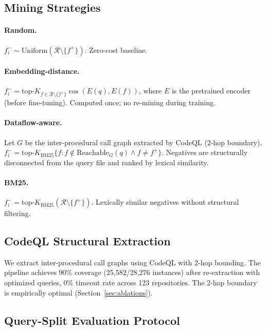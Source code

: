 \documentclass[11pt,a4paper]{article}
\begin{document}
\subsection{Mining Strategies}

\paragraph{Random.} $f_i^- \sim \text{Uniform}(\mathcal{R} \setminus \{f^+\})$. Zero-cost baseline.

\paragraph{Embedding-distance.} $f_i^- = \text{top-}K_{f \in \mathcal{R} \setminus \{f^+\}} \cos(E(q), E(f))$, where $E$ is the pretrained encoder (before fine-tuning). Computed once; no re-mining during training.

\paragraph{Dataflow-aware.} Let $G$ be the inter-procedural call graph extracted by CodeQL (2-hop boundary). $f_i^- = \text{top-}K_{\text{BM25}} \{f : f \notin \text{Reachable}_G(q) \wedge f \neq f^+\}$. Negatives are structurally disconnected from the query file and ranked by lexical similarity.

\paragraph{BM25.} $f_i^- = \text{top-}K_{\text{BM25}}(\mathcal{R} \setminus \{f^+\})$. Lexically similar negatives without structural filtering.

\subsection{CodeQL Structural Extraction}

We extract inter-procedural call graphs using CodeQL with 2-hop bounding. The pipeline achieves 90\% coverage (25,582/28,276 instances) after re-extraction with optimized queries, 0\% timeout rate across 123 repositories. The 2-hop boundary is empirically optimal (Section~\ref{sec:ablations}).

\subsection{Query-Split Evaluation Protocol}
\label{sec:querysplit}
\end{document}
